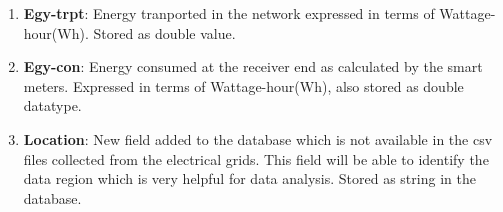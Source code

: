 \begin{enumerate}
\item \textbf{Egy-trpt}: Energy tranported in the network expressed in terms of Wattage-hour(Wh). Stored as double value.
\item \textbf{Egy-con}:  Energy consumed at the receiver end as calculated by the smart meters. Expressed in terms of Wattage-hour(Wh), also stored as double datatype.
\item \textbf{Location}: New field added to the database which is not available in the csv files collected from the electrical grids. This field will be able to identify the data region which is very helpful for data analysis. Stored as string in the database.
\end{enumerate}
\label{sec:Understanding Electrical Data}